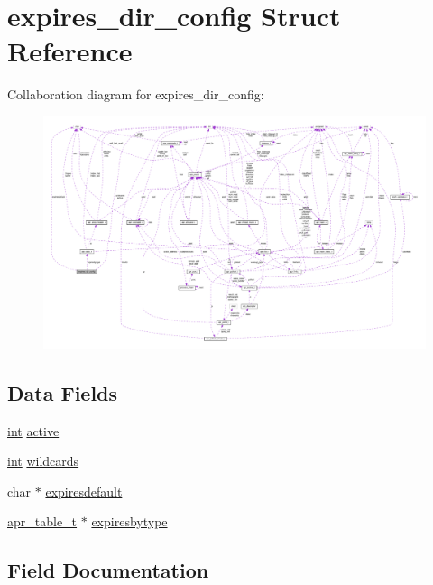 \hypertarget{structexpires__dir__config}{}\section{expires\+\_\+dir\+\_\+config Struct Reference}
\label{structexpires__dir__config}


Collaboration diagram for expires\+\_\+dir\+\_\+config\+:
\nopagebreak
\begin{figure}[H]
\begin{center}
\leavevmode
\includegraphics[width=350pt]{structexpires__dir__config__coll__graph}
\end{center}
\end{figure}
\subsection*{Data Fields}
\begin{DoxyCompactItemize}
\item 
\hyperlink{pcre_8txt_a42dfa4ff673c82d8efe7144098fbc198}{int} \hyperlink{structexpires__dir__config_a98c03526d4a7eca3c3c9b03f58810d1b}{active}
\item 
\hyperlink{pcre_8txt_a42dfa4ff673c82d8efe7144098fbc198}{int} \hyperlink{structexpires__dir__config_ab7eda28f0631757e611bb1a44bbfe0e1}{wildcards}
\item 
char $\ast$ \hyperlink{structexpires__dir__config_a077028bd6f6d4e6736399f00144027c0}{expiresdefault}
\item 
\hyperlink{structapr__table__t}{apr\+\_\+table\+\_\+t} $\ast$ \hyperlink{structexpires__dir__config_a7c075cc52083f1561b307c0c5fffcbb6}{expiresbytype}
\end{DoxyCompactItemize}


\subsection{Field Documentation}
